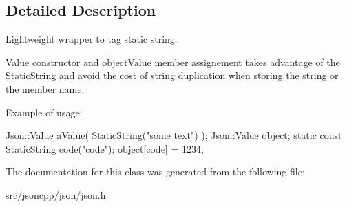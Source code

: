 \subsection{Detailed Description}
Lightweight wrapper to tag static string. 

\hyperlink{classJson_1_1Value}{Value} constructor and object\+Value member assignement takes advantage of the \hyperlink{classJson_1_1StaticString}{Static\+String} and avoid the cost of string duplication when storing the string or the member name.

Example of usage\+: 
\begin{DoxyCode}
\hyperlink{classJson_1_1Value}{Json::Value} aValue( StaticString(\textcolor{stringliteral}{"some text"}) );
\hyperlink{classJson_1_1Value}{Json::Value} object;
\textcolor{keyword}{static} \textcolor{keyword}{const} StaticString code(\textcolor{stringliteral}{"code"});
\textcolor{keywordtype}{object}[code] = 1234;
\end{DoxyCode}
 

The documentation for this class was generated from the following file\+:\begin{DoxyCompactItemize}
\item 
src/jsoncpp/json/json.\+h\end{DoxyCompactItemize}
